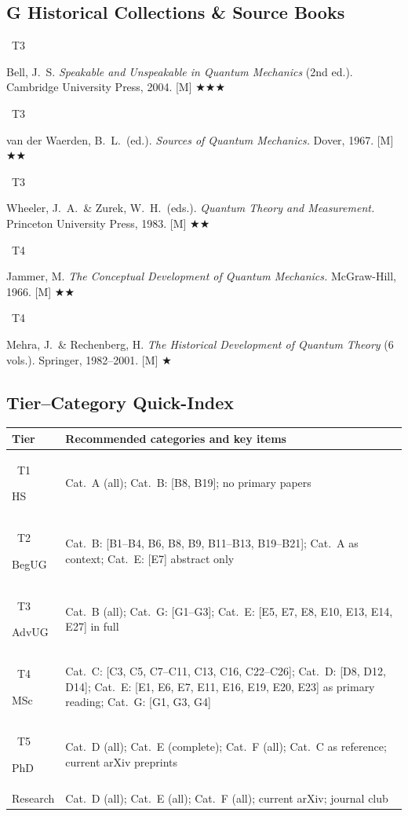 \documentclass[11pt,a4paper]{article}
\newcommand{\tierbadge}[2]{\colorbox{#1}{\small\bfseries\color{white}\strut\ #2\ }}
\newcommand{\essential}{$\bigstar\bigstar\bigstar$}
\newcommand{\recommended}{$\bigstar\bigstar$}
\newcommand{\useful}{$\bigstar$}
\begin{document}
\subsection*{G \quad Historical Collections \& Source Books}
\begin{tcolorbox}[catbox]
\begin{enumerate}[leftmargin=2.5em,label=\textbf{[G\arabic*]},itemsep=3pt]
  \item \tierbadge{t3purple}{T3} Bell, J.~S. \textit{Speakable and Unspeakable in Quantum Mechanics} (2nd ed.). Cambridge University Press, 2004. [M] \essential
  \item \tierbadge{t3purple}{T3} van der Waerden, B.~L.\ (ed.). \textit{Sources of Quantum Mechanics.} Dover, 1967. [M] \recommended
  \item \tierbadge{t3purple}{T3} Wheeler, J.~A.\ \& Zurek, W.~H.\ (eds.). \textit{Quantum Theory and Measurement.} Princeton University Press, 1983. [M] \recommended
  \item \tierbadge{t4orange}{T4} Jammer, M. \textit{The Conceptual Development of Quantum Mechanics.} McGraw-Hill, 1966. [M] \recommended
  \item \tierbadge{t4orange}{T4} Mehra, J.\ \& Rechenberg, H. \textit{The Historical Development of Quantum Theory} (6 vols.). Springer, 1982--2001. [M] \useful
\end{enumerate}
\end{tcolorbox}

\bigskip
\subsection*{Tier--Category Quick-Index}
\begin{center}
\begin{tabular}{lp{11.5cm}}
\toprule
\textbf{Tier} & \textbf{Recommended categories and key items}\\
\midrule
\tierbadge{t1green}{T1} HS
  & Cat.~A (all); Cat.~B: [B8, B19]; no primary papers\\[3pt]
\tierbadge{t2blue}{T2} BegUG
  & Cat.~B: [B1--B4, B6, B8, B9, B11--B13, B19--B21]; Cat.~A as context;
    Cat.~E: [E7] abstract only\\[3pt]
\tierbadge{t3purple}{T3} AdvUG
  & Cat.~B (all); Cat.~G: [G1--G3];
    Cat.~E: [E5, E7, E8, E10, E13, E14, E27] in full\\[3pt]
\tierbadge{t4orange}{T4} MSc
  & Cat.~C: [C3, C5, C7--C11, C13, C16, C22--C26]; Cat.~D: [D8, D12, D14];
    Cat.~E: [E1, E6, E7, E11, E16, E19, E20, E23] as primary reading;
    Cat.~G: [G1, G3, G4]\\[3pt]
\tierbadge{t5red}{T5} PhD
  & Cat.~D (all); Cat.~E (complete); Cat.~F (all); Cat.~C as reference;
    current arXiv preprints\\[3pt]
Research
  & Cat.~D (all); Cat.~E (all); Cat.~F (all); current arXiv; journal club\\
\bottomrule
\end{tabular}
\end{center}

\end{document}
